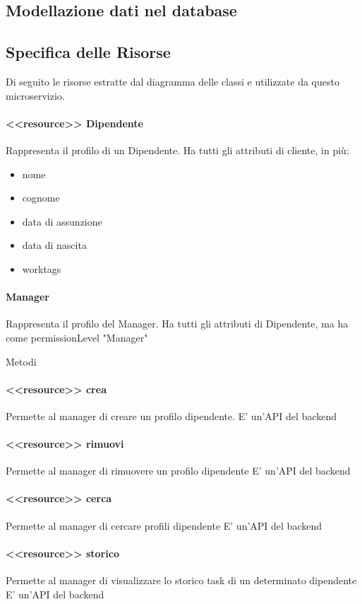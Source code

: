\documentclass{report}
\begin{document}
\subsection*{Modellazione dati nel database}
\subsection*{Specifica delle Risorse}
Di seguito le risorse estratte dal diagramma delle classi e utilizzate da questo microservizio.
\paragraph*{<<resource>> Dipendente}
Rappresenta il profilo di un Dipendente.
Ha tutti gli attributi di cliente, in più:
\begin{itemize}
	\item nome
	\item cognome
	\item data di assunzione
	\item data di nascita
	\item worktags
\end{itemize}
\paragraph*{Manager}
Rappresenta il profilo del Manager.
Ha tutti gli attributi di Dipendente, ma ha come permissionLevel "Manager"

Metodi
\paragraph*{<<resource>> crea}
Permette al manager di creare un profilo dipendente.
E' un'API del backend
\paragraph*{<<resource>> rimuovi}
Permette al manager di rimuovere un profilo dipendente
E' un'API del backend
\paragraph*{<<resource>> cerca}
Permette al manager di cercare profili dipendente
E' un'API del backend
\paragraph*{<<resource>> storico}
Permette al manager di visualizzare lo storico task di un determinato dipendente
E' un'API del backend
\end{document}

